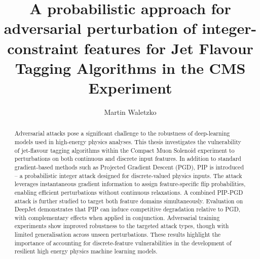 \documentclass[12pt]{caltech_thesis}
\begin{document}
\title{\textbf{A probabilistic approach for adversarial perturbation of integer-constraint features for Jet Flavour Tagging Algorithms in the CMS Experiment}}
\author{Martin Waletzko}




\maketitle

\begin{acknowledgements}
\end{acknowledgements}

\begin{abstract}

Adversarial attacks pose a significant challenge to the robustness of deep-learning models used in high-energy physics analyses. This thesis investigates the vulnerability of jet-flavour tagging algorithms within the Compact Muon Solenoid experiment to perturbations on both continuous and discrete input features. In addition to standard gradient-based methods such as Projected Gradient Descent (PGD), PIP is introduced – a probabilistic integer attack designed for discrete-valued physics inputs. The attack leverages instantaneous gradient information to assign feature-specific flip probabilities, enabling efficient perturbations without continuous relaxations. A combined PIP-PGD attack is further studied to target both feature domains simultaneously. Evaluation on DeepJet demonstrates that PIP can induce competitive degradation relative to PGD, with complementary effects when applied in conjunction. Adversarial training experiments show improved robustness to the targeted attack types, though with limited generalisation across unseen perturbations. These results highlight the importance of accounting for discrete-feature vulnerabilities in the development of resilient high energy physics machine learning models.

\vfill
\noindent{}

\end{abstract}
\end{document}
